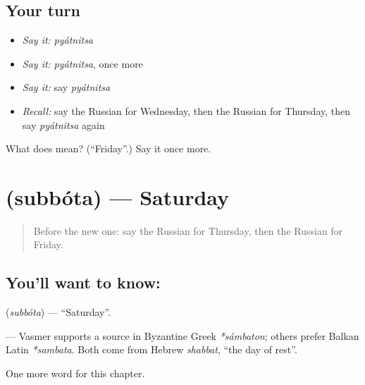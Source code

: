 \subsection*{Your turn}
\begin{itemize}
\raggedright
  \item \emph{Say it:} \emph{pyátnitsa}
  \item \emph{Say it:} \emph{pyátnitsa}, once more
  \item \emph{Say it:} say \emph{pyátnitsa}
  \item \emph{Recall:} say the Russian for Wednesday, then the Russian for Thursday, then say \emph{pyátnitsa} again
\end{itemize}

\begin{tcolorbox}[breakable,colback=teal!4,colframe=teal!35!black,title={Before you move on}]
What does  mean? (\textquotedblleft{}Friday\textquotedblright{}.) Say it once more.
\end{tcolorbox}
\section[\texorpdfstring{\ru{суббота} (subbóta)}{суббота (subbóta)}]{ (subbóta) — Saturday}

\label{lesson:RU-C70-saturday}



\begin{quote}
Before the new one: say the Russian for Thursday, then the Russian for Friday.
\end{quote}

\subsection*{You'll want to know: }
\textbf{} (\emph{subbóta}) — \textquotedblleft{}Saturday\textquotedblright{}.

\begin{cousinweb}
\textbf{} — Vasmer supports a source in Byzantine Greek \emph{*sámbaton}; others prefer Balkan Latin \emph{*sambata}. Both come from Hebrew \emph{shabbat}, \textquotedblleft{}the day of rest\textquotedblright{}.
\end{cousinweb}

\begin{grammarlens}[title={What you've built}]
One more word for this chapter.
\end{grammarlens}

